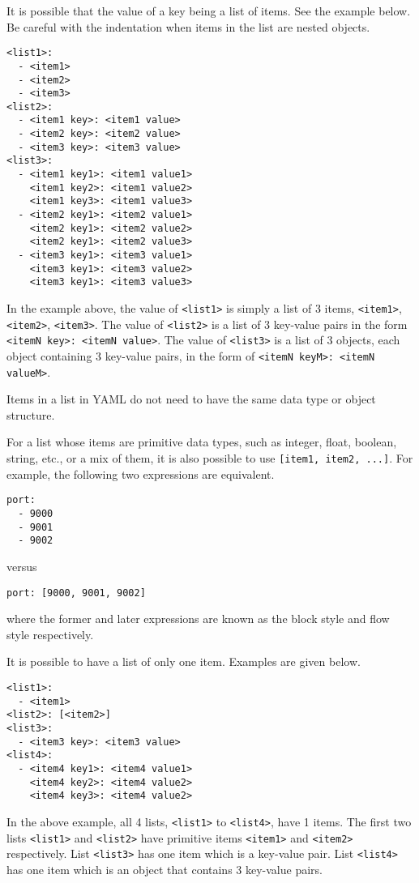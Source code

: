 It is possible that the value of a key being a list of items. See the example below. Be careful with the indentation when items in the list are nested objects.
\begin{lstlisting}
<list1>:
  - <item1>
  - <item2>
  - <item3>
<list2>:
  - <item1 key>: <item1 value>
  - <item2 key>: <item2 value>
  - <item3 key>: <item3 value>
<list3>:
  - <item1 key1>: <item1 value1>
    <item1 key2>: <item1 value2>
    <item1 key3>: <item1 value3>
  - <item2 key1>: <item2 value1>
    <item2 key1>: <item2 value2>
    <item2 key1>: <item2 value3>
  - <item3 key1>: <item3 value1>
    <item3 key1>: <item3 value2>
    <item3 key1>: <item3 value3>
\end{lstlisting}
In the example above, the value of \verb|<list1>| is simply a list of 3 items, \verb|<item1>|, \verb|<item2>|, \verb|<item3>|. The value of \verb|<list2>| is a list of 3 key-value pairs in the form \verb|<itemN key>: <itemN value>|. The value of \verb|<list3>| is a list of 3 objects, each object containing 3 key-value pairs, in the form of \verb|<itemN keyM>: <itemN valueM>|.

Items in a list in YAML do not need to have the same data type or object structure.

For a list whose items are primitive data types, such as integer, float, boolean, string, etc., or a mix of them, it is also possible to use \verb|[item1, item2, ...]|. For example, the following two expressions are equivalent.
\begin{lstlisting}
port:
  - 9000
  - 9001
  - 9002
\end{lstlisting}
versus
\begin{lstlisting}
port: [9000, 9001, 9002]
\end{lstlisting}
where the former and later expressions are known as the block style and flow style respectively.

It is possible to have a list of only one item. Examples are given below.
\begin{lstlisting}
<list1>:
  - <item1>
<list2>: [<item2>]
<list3>:
  - <item3 key>: <item3 value>
<list4>:
  - <item4 key1>: <item4 value1>
    <item4 key2>: <item4 value2>
    <item4 key3>: <item4 value2>
\end{lstlisting}
In the above example, all 4 lists, \verb|<list1>| to \verb|<list4>|, have 1 items. The first two lists \verb|<list1>| and \verb|<list2>| have primitive items \verb|<item1>| and \verb|<item2>| respectively. List \verb|<list3>| has one item which is a key-value pair. List \verb|<list4>| has one item which is an object that contains 3 key-value pairs.


